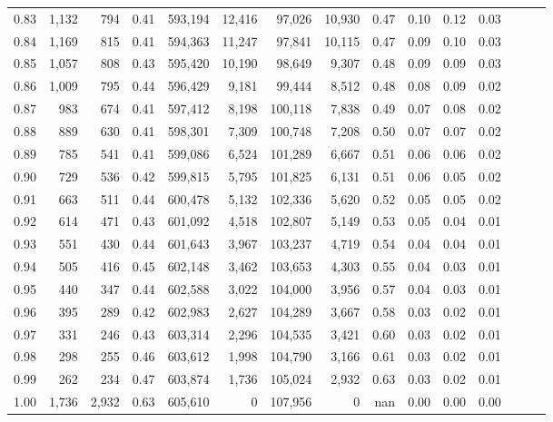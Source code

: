 \begin{tabular}{rrrrrrrrrrrrrrr}
0.83 &   1,132 &    794 &  0.41 &  593,194 &   12,416 &   97,026 &   10,930 &  0.47 &  0.10 &  0.12 &      0.03 \\
0.84 &   1,169 &    815 &  0.41 &  594,363 &   11,247 &   97,841 &   10,115 &  0.47 &  0.09 &  0.10 &      0.03 \\
0.85 &   1,057 &    808 &  0.43 &  595,420 &   10,190 &   98,649 &    9,307 &  0.48 &  0.09 &  0.09 &      0.03 \\
0.86 &   1,009 &    795 &  0.44 &  596,429 &    9,181 &   99,444 &    8,512 &  0.48 &  0.08 &  0.09 &      0.02 \\
0.87 &     983 &    674 &  0.41 &  597,412 &    8,198 &  100,118 &    7,838 &  0.49 &  0.07 &  0.08 &      0.02 \\
0.88 &     889 &    630 &  0.41 &  598,301 &    7,309 &  100,748 &    7,208 &  0.50 &  0.07 &  0.07 &      0.02 \\
0.89 &     785 &    541 &  0.41 &  599,086 &    6,524 &  101,289 &    6,667 &  0.51 &  0.06 &  0.06 &      0.02 \\
0.90 &     729 &    536 &  0.42 &  599,815 &    5,795 &  101,825 &    6,131 &  0.51 &  0.06 &  0.05 &      0.02 \\
0.91 &     663 &    511 &  0.44 &  600,478 &    5,132 &  102,336 &    5,620 &  0.52 &  0.05 &  0.05 &      0.02 \\
0.92 &     614 &    471 &  0.43 &  601,092 &    4,518 &  102,807 &    5,149 &  0.53 &  0.05 &  0.04 &      0.01 \\
0.93 &     551 &    430 &  0.44 &  601,643 &    3,967 &  103,237 &    4,719 &  0.54 &  0.04 &  0.04 &      0.01 \\
0.94 &     505 &    416 &  0.45 &  602,148 &    3,462 &  103,653 &    4,303 &  0.55 &  0.04 &  0.03 &      0.01 \\
0.95 &     440 &    347 &  0.44 &  602,588 &    3,022 &  104,000 &    3,956 &  0.57 &  0.04 &  0.03 &      0.01 \\
0.96 &     395 &    289 &  0.42 &  602,983 &    2,627 &  104,289 &    3,667 &  0.58 &  0.03 &  0.02 &      0.01 \\
0.97 &     331 &    246 &  0.43 &  603,314 &    2,296 &  104,535 &    3,421 &  0.60 &  0.03 &  0.02 &      0.01 \\
0.98 &     298 &    255 &  0.46 &  603,612 &    1,998 &  104,790 &    3,166 &  0.61 &  0.03 &  0.02 &      0.01 \\
0.99 &     262 &    234 &  0.47 &  603,874 &    1,736 &  105,024 &    2,932 &  0.63 &  0.03 &  0.02 &      0.01 \\
1.00 &   1,736 &  2,932 &  0.63 &  605,610 &        0 &  107,956 &        0 &   nan &  0.00 &  0.00 &      0.00 \\
\bottomrule
\end{tabular}

